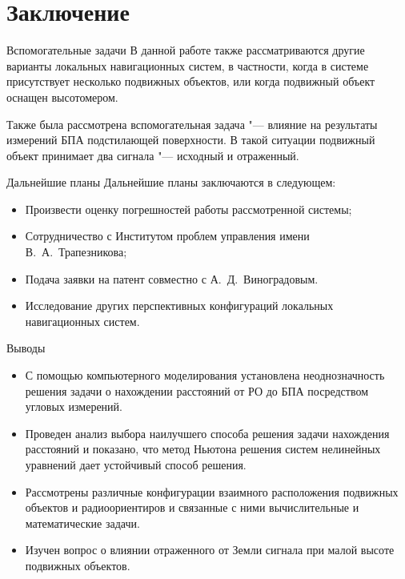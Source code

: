 \documentclass[russian,hyperref={unicode}]{beamer}
\begin{document}
  \section{Заключение}

  \begin{frame}{Вспомогательные задачи}
    В данной работе также рассматриваются другие варианты локальных навигационных систем, в частности, когда в системе присутствует несколько подвижных объектов, или когда подвижный объект оснащен высотомером.

    Также была рассмотрена вспомогательная задача "--- влияние на результаты измерений БПА подстилающей поверхности. В такой ситуации подвижный объект принимает два сигнала "--- исходный и отраженный.
  \end{frame}

  \begin{frame}{Дальнейшие планы}
    Дальнейшие планы заключаются в следующем:
    \begin{itemize}
      \item Произвести оценку погрешностей работы рассмотренной системы;
      \item Сотрудничество с Институтом проблем управления имени В.~А.~Трапезникова;
      \item Подача заявки на патент совместно с А.~Д.~Виноградовым.
      \item Исследование других перспективных конфигураций локальных навигационных систем.
    \end{itemize}
  \end{frame}

  \begin{frame}{Выводы}
    \begin{itemize}
      \item С помощью компьютерного моделирования установлена неоднозначность решения задачи о нахождении расстояний от РО до БПА посредством угловых измерений.
      \item Проведен анализ выбора наилучшего способа решения задачи нахождения расстояний и показано, что метод Ньютона решения систем нелинейных уравнений дает устойчивый способ решения.
      \item Рассмотрены различные конфигурации взаимного расположения подвижных объектов и радиоориентиров и связанные с ними вычислительные и математические задачи.
      \item Изучен вопрос о влиянии отраженного от Земли сигнала при малой высоте подвижных объектов.
    \end{itemize}
  \end{frame}
\end{document}
